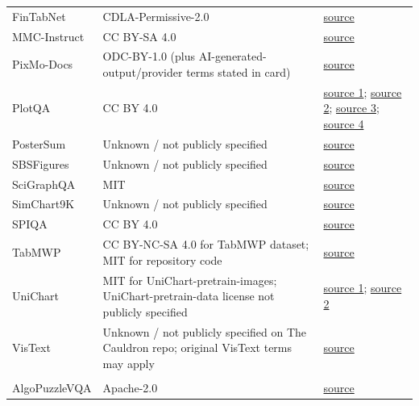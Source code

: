 \begin{longtable}{@{}>{\raggedright\arraybackslash}p{}>{\raggedright\arraybackslash}p{}>{\raggedright\arraybackslash}p{}@{}}
FinTabNet & CDLA-Permissive-2.0 & \href{https://huggingface.co/datasets/bsmock/FinTabNet.c}{source} \\
MMC-Instruct & CC BY-SA 4.0 & \href{https://huggingface.co/datasets/xywang1/MMC}{source} \\
PixMo-Docs & ODC-BY-1.0 (plus AI-generated-output/provider terms stated in card) & \href{https://huggingface.co/datasets/allenai/pixmo-docs}{source} \\
PlotQA & CC BY 4.0 & \href{https://drive.google.com/file/d/1AYuaPX-Lx7T0GZvnsPgN11Twq2FZbWXL/view?usp=sharing}{source 1}; \href{https://drive.google.com/file/d/1bBSUutd-Die27ZH3QTMVhBjW9l5hAwrr/view?usp=sharing}{source 2}; \href{https://drive.google.com/file/d/1UNvkdq1YJD_ne6D3zbWtoQij37AtfpNp/view?usp=sharing}{source 3}; \href{https://drive.google.com/file/d/1VzWwxBVrlep17BGZU17GpLuGpwjyWbzq/view?usp=sharing}{source 4} \\
PosterSum & Unknown / not publicly specified & \href{https://huggingface.co/datasets/rohitsaxena/PosterSum}{source} \\
SBSFigures & Unknown / not publicly specified & \href{https://huggingface.co/datasets/omron-sinicx/sbsfigures}{source} \\
SciGraphQA & MIT & \href{https://huggingface.co/datasets/alexshengzhili/SciGraphQA-295K-train}{source} \\
SimChart9K & Unknown / not publicly specified & \href{https://drive.google.com/file/d/1M_NA3sIJNwCUfqB1HH0p4lsnEm3NbvsI/view?usp=sharing}{source} \\
SPIQA & CC BY 4.0 & \href{https://huggingface.co/datasets/google/spiqa}{source} \\
TabMWP & CC BY-NC-SA 4.0 for TabMWP dataset; MIT for repository code & \href{https://github.com/lupantech/PromptPG.git}{source} \\
UniChart & MIT for UniChart-pretrain-images; UniChart-pretrain-data license not publicly specified & \href{https://huggingface.co/datasets/ahmed-masry/UniChart-pretrain-images}{source 1}; \href{https://huggingface.co/datasets/ahmed-masry/unichart-pretrain-data}{source 2} \\
VisText & Unknown / not publicly specified on The Cauldron repo; original VisText terms may apply & \href{https://huggingface.co/datasets/HuggingFaceM4/the_cauldron/tree/main/vistext}{source} \\
\midrule
\rowcolor{instructcolor}\multicolumn{3}{l}{\textit{General QA}} \\
AlgoPuzzleVQA & Apache-2.0 & \href{https://huggingface.co/datasets/declare-lab/AlgoPuzzleVQA}{source} \\

\end{longtable}
